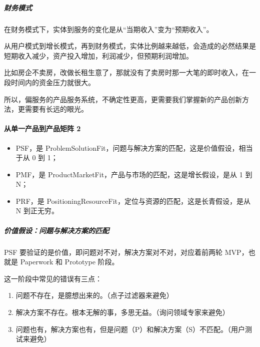 \documentclass[letterpaper,11pt,english]{sphinxmanual}
\begin{document}
\subparagraph{财务模式}
\label{\detokenize{chapter_introduction/Product:id32}}
在财务模式下，实体到服务的变化是从“当期收入”变为“预期收入”。

从用户模式到增长模式，再到财务模式，实体比例越来越低，会造成的必然结果是短期收入减少，资产投入增加，利润减少，但预期利润增加。

比如房企不卖房，改做长租生意了，那就没有了卖房时那一大笔的即时收入，在一段时间内的资金压力就很大。

所以，偏服务的产品服务系统，不确定性更高，更需要我们掌握新的产品创新方法，更需要有长远的眼光。


\paragraph{从单一产品到产品矩阵 2\sphinxfootnotemark[8]}
\label{\detokenize{chapter_introduction/Product:id33}}%
\begin{footnotetext}[8]\sphinxAtStartFootnote
{}
%
\end{footnotetext}\ignorespaces \begin{itemize}
\item {} 
PSF，是
Problem\sphinxhyphen{}Solution\sphinxhyphen{}Fit，问题与解决方案的匹配，这是价值假设，相当于从 0
到 1；

\item {} 
PMF，是 Product\sphinxhyphen{}Market\sphinxhyphen{}Fit，产品与市场的匹配，这是增长假设，是从 1 到
N；

\item {} 
PRF，是
Positioning\sphinxhyphen{}Resource\sphinxhyphen{}Fit，定位与资源的匹配，这是长青假设，是从 N
到正无穷。

\end{itemize}


\subparagraph{价值假设：问题与解决方案的匹配}
\label{\detokenize{chapter_introduction/Product:id34}}
PSF 要验证的是价值，即问题对不对，解决方案对不对，对应着前两轮
MVP，也就是 Paperwork 和 Prototype 阶段。

这一阶段中常见的错误有三点：
\begin{enumerate}
%
\item {} 
问题不存在，是臆想出来的。（点子过滤器来避免）

\item {} 
解决方案不存在。根本无解的事，多思无益。（询问领域专家来避免）

\item {} 
问题也有，解决方案也有，但是问题（P）和解决方案（S）不匹配。（用户测试来避免）

\end{enumerate}
\end{document}
